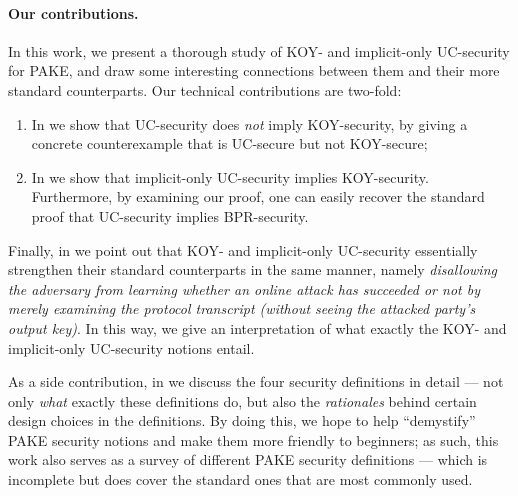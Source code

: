 \documentclass{article}
\begin{document}
\paragraph{Our contributions.}
In this work, we present a thorough study of KOY- and implicit-only UC-security for PAKE, and draw some interesting connections between them and their more standard counterparts. Our technical contributions are two-fold:
\begin{enumerate}
  \item In  we show that UC-security does \emph{not} imply KOY-security, by giving a concrete counterexample that is UC-secure but not KOY-secure;
  \item In  we show that implicit-only UC-security implies KOY-security. Furthermore, by examining our proof, one can easily recover the standard proof that UC-security implies BPR-security.
\end{enumerate}
\usetikzlibrary{decorations.markings}
\begin{figure}[H]
\begin{center}
\end{center}
\end{figure}
Finally, in  we point out that KOY- and implicit-only UC-security essentially strengthen their standard counterparts in the same manner, namely \emph{disallowing the adversary from learning whether an online attack has succeeded or not by merely examining the protocol transcript (without seeing the attacked party's output key)}. In this way, we give an interpretation of what exactly the KOY- and implicit-only UC-security notions entail.

As a side contribution, in  we discuss the four security definitions in detail --- not only \emph{what} exactly these definitions do, but also the \emph{rationales} behind certain design choices in the definitions. By doing this, we hope to help ``demystify'' PAKE security notions and make them more friendly to beginners; as such, this work also serves as a survey of different PAKE security definitions --- which is incomplete but does cover the standard ones that are most commonly used.
\end{document}
